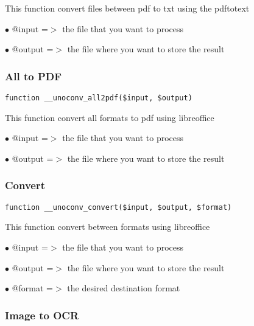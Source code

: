 \documentclass[a4paper]{article}
\begin{document}
This function convert files between pdf to txt using the pdftotext

\begin{compactitem}
\item[\color{myblue}$\bullet$] @input  =$>$ the file that you want to process
\item[\color{myblue}$\bullet$] @output =$>$ the file where you want to store the result
\end{compactitem}

\hypertarget{toc537}{}
\subsubsection{All to PDF}

\begin{lstlisting}
function __unoconv_all2pdf($input, $output)
\end{lstlisting}

This function convert all formats to pdf using libreoffice

\begin{compactitem}
\item[\color{myblue}$\bullet$] @input  =$>$ the file that you want to process
\item[\color{myblue}$\bullet$] @output =$>$ the file where you want to store the result
\end{compactitem}

\hypertarget{toc538}{}
\subsubsection{Convert}

\begin{lstlisting}
function __unoconv_convert($input, $output, $format)
\end{lstlisting}

This function convert between formats using libreoffice

\begin{compactitem}
\item[\color{myblue}$\bullet$] @input  =$>$ the file that you want to process
\item[\color{myblue}$\bullet$] @output =$>$ the file where you want to store the result
\item[\color{myblue}$\bullet$] @format =$>$ the desired destination format
\end{compactitem}

\hypertarget{toc539}{}
\subsubsection{Image to OCR}
\end{document}
